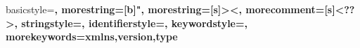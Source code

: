 \newcommand{\etal}{\emph{et al}}
\newcommand{\oflops}{OFLOPS\xspace}
\newcommand{\sdnsim}{SDNSIM\xspace}
\newcommand{\of}{OpenFlow\xspace}
\def\etal{{\it et al.}}

\usepackage{color}
\makeatletter \newcommand {}
  \newcommand\l@todo[2]
      {\par\noindent \textit{#2}, \parbox{10cm}{#1}\par} \makeatother

\newcommand{\todo}[1]{
    \addcontentsline{tdo}{todo}{\protect{#1}}
  \emph{\color{red}{#1}}
    }

\newcommand{\unik}{unikernel}
\newcommand{\Unik}{Unikernel}
\newcommand{\mirage}{Mirage}
\newcommand{\Mirage}{Mirage}
\newcommand{\mirageurl}{\emph{http://openmirage.org}}

\usepackage{listings,color}
 
 
 
{
  basicstyle=\ttfamily\color{darkblue}\bfseries,
  morestring=[b]",
  morestring=[s]{>}{<},
  morecomment=[s]{<?}{?>},
  stringstyle=\color{black},
  identifierstyle=\color{darkblue},
  keywordstyle=\color{cyan},
  morekeywords={xmlns,version,type}%
}
